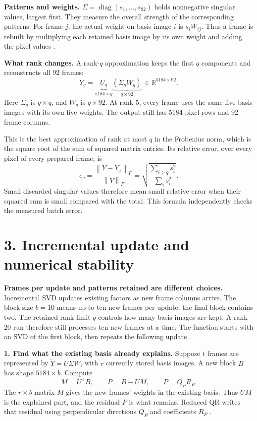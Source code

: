 \documentclass[11pt,a4paper]{article}
\newcommand{\norm}[1]{\left\lVert #1\right\rVert}
\begin{document}
\textbf{Patterns and weights.}
\(\Sigma=\operatorname{diag}(s_1,\ldots,s_{92})\) holds nonnegative singular
values, largest first. They measure the overall strength of the corresponding
patterns. For frame \(j\), the actual weight on basis image \(i\) is
\(s_iW_{ij}\). Thus a frame is rebuilt by multiplying each retained basis
image by its own weight and adding the pixel values \cite{numpy,damle}.

\textbf{What rank changes.} A rank-\(q\) approximation keeps the first \(q\)
components and reconstructs all 92 frames:
\begin{equation}
Y_q=\underbrace{U_q}_{5184\times q}
    \underbrace{(\Sigma_qW_q)}_{q\times92}
    \ \in\mathbb{R}^{5184\times92}.
\label{eq:rankq}
\end{equation}
Here \(\Sigma_q\) is \(q\times q\), and \(W_q\) is \(q\times92\).
At rank 5, every frame uses the same five basis images with its own five
weights. The output still has 5184 pixel rows and 92 frame columns.

This is the best approximation of rank at most \(q\) in the Frobenius norm,
which is the square root of the sum of squared matrix entries. Its relative
error, over every pixel of every prepared frame, is \cite{nov13,damle}
\begin{equation}
e_q=\frac{\norm{Y-Y_q}_F}{\norm{Y}_F}
    =\sqrt{\frac{\sum_{i>q}s_i^2}{\sum_i s_i^2}}.
\label{eq:tail}
\end{equation}
Small discarded singular values therefore mean small relative error when
their squared sum is small compared with the total. This formula independently
checks the measured batch error.

\newpage
\section*{3. Incremental update and numerical stability}

\textbf{Frames per update and patterns retained are different choices.}
Incremental SVD updates existing factors as new frame columns arrive.
The block size \(b=10\) means up to ten new frames per update; the final
block contains two. The retained-rank limit \(q\) controls how many basis
images are kept. A rank-20 run therefore still processes ten new frames at
a time. The function starts with an SVD of the first block, then repeats
the following update \cite{kuhl}.

\textbf{1. Find what the existing basis already explains.}
Suppose \(t\) frames are represented by \(\widetilde Y=U\Sigma W\), with
\(r\) currently stored basis images. A new block \(B\) has shape
\(5184\times b\). Compute
\[
M=U^{\mathsf T}B,\qquad P=B-UM,\qquad P=Q_P R_P.
\]
The \(r\times b\) matrix \(M\) gives the new frames' weights in the existing
basis. Thus \(UM\) is the explained part, and the residual \(P\) is what
remains. Reduced QR writes that residual using perpendicular directions
\(Q_P\) and coefficients \(R_P\) \cite{nov6,overleaf}.
\end{document}
